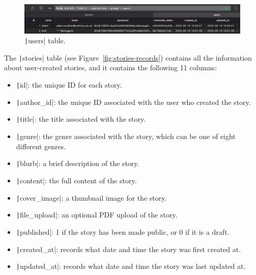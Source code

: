 \begin{figure}[!htbp]
    \centering
    \includegraphics[width=\textwidth]{resources/database/users-records}
    \caption{\texttt|users| table.}
    \label{fig:users-records}
\end{figure}

\clearpage
The \texttt|stories| table (see Figure~\ref{fig:stories-records}) contains all the information about
user-created stories, and it contains the following 11 columns:

\begin{itemize}
    \item \texttt|id|: the unique ID for each story.
    \item \texttt|author_id|: the unique ID associated with the user who created the story.
    \item \texttt|title|: the title associated with the story.
    \item \texttt|genre|: the genre associated with the story, which can be one of eight different genres.
    \item \texttt|blurb|: a brief description of the story.
    \item \texttt|content|: the full content of the story.
    \item \texttt|cover_image|: a thumbnail image for the story.
    \item \texttt|file_upload|: an optional PDF upload of the story.
    \item \texttt|published|: 1 if the story has been made public, or 0 if it is a draft.
    \item \texttt|created_at|: records what date and time the story was first created at.
    \item \texttt|updated_at|: records what date and time the story was last updated at.
\end{itemize}



